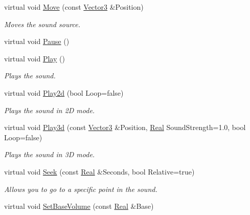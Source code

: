 \begin{DoxyCompactItemize}
virtual void \hyperlink{classMezzanine_1_1Audio_1_1Sound_a593eae500e9a29c622c8e94df2e86baa}{Move} (const \hyperlink{classMezzanine_1_1Vector3}{Vector3} \&Position)
\begin{DoxyCompactList}\small\item\em Moves the sound source. \item\end{DoxyCompactList}\item 
virtual void \hyperlink{classMezzanine_1_1Audio_1_1Sound_a2dd1ce1638240021be219774236bd837}{Pause} ()
\item 
virtual void \hyperlink{classMezzanine_1_1Audio_1_1Sound_a3cdf4ec1159b6c26a1abebcdd8255e80}{Play} ()
\begin{DoxyCompactList}\small\item\em Plays the sound. \item\end{DoxyCompactList}\item 
virtual void \hyperlink{classMezzanine_1_1Audio_1_1Sound_a5f549b02f28454d79d5f8bb35bebf679}{Play2d} (bool Loop=false)
\begin{DoxyCompactList}\small\item\em Plays the sound in 2D mode. \item\end{DoxyCompactList}\item 
virtual void \hyperlink{classMezzanine_1_1Audio_1_1Sound_a5e30d7724149dae882cd5767a05bb754}{Play3d} (const \hyperlink{classMezzanine_1_1Vector3}{Vector3} \&Position, \hyperlink{namespaceMezzanine_a726731b1a7df72bf3583e4a97282c6f6}{Real} SoundStrength=1.0, bool Loop=false)
\begin{DoxyCompactList}\small\item\em Plays the sound in 3D mode. \item\end{DoxyCompactList}\item 
virtual void \hyperlink{classMezzanine_1_1Audio_1_1Sound_a345874faf8a50fdd9f689f231d4da310}{Seek} (const \hyperlink{namespaceMezzanine_a726731b1a7df72bf3583e4a97282c6f6}{Real} \&Seconds, bool Relative=true)
\begin{DoxyCompactList}\small\item\em Allows you to go to a specific point in the sound. \item\end{DoxyCompactList}\item 
virtual void \hyperlink{classMezzanine_1_1Audio_1_1Sound_a90f305991e5ca0a5edab80a63161b6aa}{SetBaseVolume} (const \hyperlink{namespaceMezzanine_a726731b1a7df72bf3583e4a97282c6f6}{Real} \&Base)

\end{DoxyCompactItemize}
